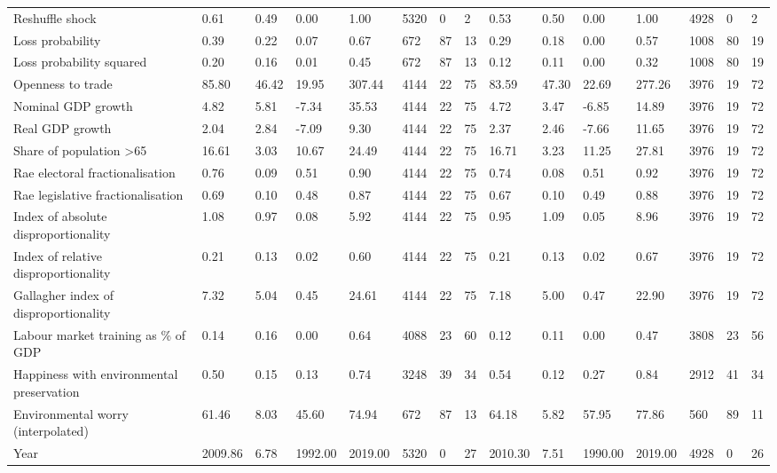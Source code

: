\begin{longtable}{lllllllllllllll}
Reshuffle shock & 0.61 & 0.49 & 0.00 & 1.00 & 5320 & 0 & 2 & 0.53 & 0.50 & 0.00 & 1.00 & 4928 & 0 & 2\\
Loss probability & 0.39 & 0.22 & 0.07 & 0.67 & 672 & 87 & 13 & 0.29 & 0.18 & 0.00 & 0.57 & 1008 & 80 & 19\\
\addlinespace
Loss probability squared & 0.20 & 0.16 & 0.01 & 0.45 & 672 & 87 & 13 & 0.12 & 0.11 & 0.00 & 0.32 & 1008 & 80 & 19\\
Openness to trade & 85.80 & 46.42 & 19.95 & 307.44 & 4144 & 22 & 75 & 83.59 & 47.30 & 22.69 & 277.26 & 3976 & 19 & 72\\
Nominal GDP growth & 4.82 & 5.81 & -7.34 & 35.53 & 4144 & 22 & 75 & 4.72 & 3.47 & -6.85 & 14.89 & 3976 & 19 & 72\\
Real GDP growth & 2.04 & 2.84 & -7.09 & 9.30 & 4144 & 22 & 75 & 2.37 & 2.46 & -7.66 & 11.65 & 3976 & 19 & 72\\
Share of population >65 & 16.61 & 3.03 & 10.67 & 24.49 & 4144 & 22 & 75 & 16.71 & 3.23 & 11.25 & 27.81 & 3976 & 19 & 72\\
\addlinespace
Rae electoral fractionalisation & 0.76 & 0.09 & 0.51 & 0.90 & 4144 & 22 & 75 & 0.74 & 0.08 & 0.51 & 0.92 & 3976 & 19 & 72\\
Rae legislative fractionalisation & 0.69 & 0.10 & 0.48 & 0.87 & 4144 & 22 & 75 & 0.67 & 0.10 & 0.49 & 0.88 & 3976 & 19 & 72\\
Index of absolute disproportionality & 1.08 & 0.97 & 0.08 & 5.92 & 4144 & 22 & 75 & 0.95 & 1.09 & 0.05 & 8.96 & 3976 & 19 & 72\\
Index of relative disproportionality & 0.21 & 0.13 & 0.02 & 0.60 & 4144 & 22 & 75 & 0.21 & 0.13 & 0.02 & 0.67 & 3976 & 19 & 72\\
Gallagher index of disproportionality & 7.32 & 5.04 & 0.45 & 24.61 & 4144 & 22 & 75 & 7.18 & 5.00 & 0.47 & 22.90 & 3976 & 19 & 72\\
\addlinespace
Labour market training as \% of GDP & 0.14 & 0.16 & 0.00 & 0.64 & 4088 & 23 & 60 & 0.12 & 0.11 & 0.00 & 0.47 & 3808 & 23 & 56\\
Happiness with environmental preservation & 0.50 & 0.15 & 0.13 & 0.74 & 3248 & 39 & 34 & 0.54 & 0.12 & 0.27 & 0.84 & 2912 & 41 & 34\\
Environmental worry (interpolated) & 61.46 & 8.03 & 45.60 & 74.94 & 672 & 87 & 13 & 64.18 & 5.82 & 57.95 & 77.86 & 560 & 89 & 11\\
Year & 2009.86 & 6.78 & 1992.00 & 2019.00 & 5320 & 0 & 27 & 2010.30 & 7.51 & 1990.00 & 2019.00 & 4928 & 0 & 26\\
\bottomrule
\end{longtable}
